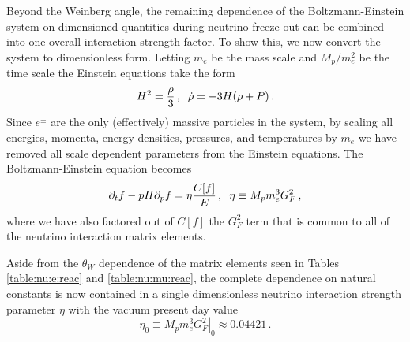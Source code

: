 Beyond the Weinberg angle, the remaining dependence of the Boltzmann-Einstein system on dimensioned quantities during neutrino freeze-out can be combined into one overall interaction strength factor. To show this, we now convert the system to dimensionless form. Letting $m_e$ be the mass scale and $M_p/m_e^2$ be the time scale the Einstein equations take the form
\begin{equation}
H^2=\frac{\rho}{3}\,,\hspace{2mm}\dot\rho=-3H(\rho+P)\,.
\end{equation}
 Since $e^\pm$ are the only (effectively) massive particles in the system, by scaling all energies, momenta, energy densities, pressures, and temperatures by $m_e$ we have removed all scale dependent parameters from the Einstein equations. The Boltzmann-Einstein equation becomes
\begin{equation}\label{etaDef}
\partial_tf-pH\partial_pf=\eta\frac{C[f]}{E}\,,\hspace{2mm}\eta\equiv M_p m_e^3G_F^2\,,
\end{equation}
where we have also factored out of $C[f]$ the $G_F^2$ term that is common to all of the neutrino interaction matrix elements. 

Aside from the $\theta_W$ dependence of the matrix elements seen in Tables \ref{table:nu:e:reac} and \ref{table:nu:mu:reac}, the complete dependence on natural constants is now contained in a single dimensionless neutrino interaction strength parameter $\eta$ with the vacuum present day value
\begin{equation}\label{eta0Def}
\eta_0\equiv \left.M_p m_e^3 G_F^2\right|_0 \approx 0.04421\, .
\end{equation}

